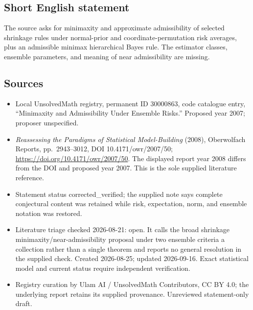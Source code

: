 \documentclass[11pt]{article}
\begin{document}
\subsection{Short English statement}
The source asks for minimaxity and approximate admissibility of selected shrinkage rules under normal-prior and coordinate-permutation risk averages, plus an admissible minimax hierarchical Bayes rule. The estimator classes, ensemble parameters, and meaning of near admissibility are missing.
\subsection{Sources}
\begin{itemize}
\item Local UnsolvedMath registry, permanent ID 30000863, code catalogue entry, ``Minimaxity and Admissibility Under Ensemble Risks.'' Proposed year 2007; proposer unspecified.
\item \emph{Reassessing the Paradigms of Statistical Model-Building} (2008), Oberwolfach Reports, pp.\ 2943--3012, DOI 10.4171/owr/2007/50; \url{https://doi.org/10.4171/owr/2007/50}. The displayed report year 2008 differs from the DOI and proposed year 2007. This is the sole supplied literature reference.
\item Statement status corrected\_verified; the supplied note says complete conjectural content was retained while risk, expectation, norm, and ensemble notation was restored.
\item Literature triage checked 2026-08-21: open. It calls the broad shrinkage minimaxity/near-admissibility proposal under two ensemble criteria a collection rather than a single theorem and reports no general resolution in the supplied check. Created 2026-08-25; updated 2026-09-16. Exact statistical model and current status require independent verification.
\item Registry curation by Ulam AI / UnsolvedMath Contributors, CC BY 4.0; the underlying report retains its supplied provenance. Unreviewed statement-only draft.
\end{itemize}
\end{document}
